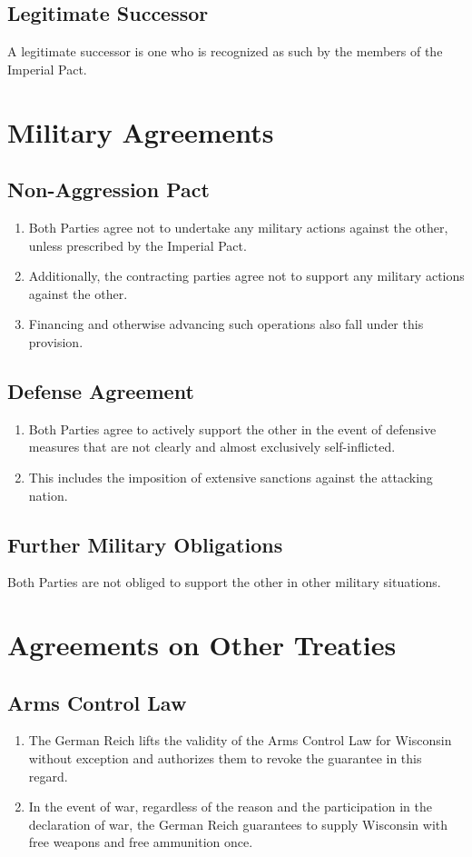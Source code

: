 \documentclass{article}
\begin{document}
\subsection{Legitimate Successor}
A legitimate successor is one who is recognized as such by the members of the Imperial Pact.

\section{Military Agreements}
\subsection{Non-Aggression Pact}
\begin{enumerate}[(1)]
    \item Both Parties agree not to undertake any military actions against the other, unless prescribed by the Imperial Pact.
    \item Additionally, the contracting parties agree not to support any military actions against the other.
    \item Financing and otherwise advancing such operations also fall under this provision.
\end{enumerate}

\subsection{Defense Agreement}
\begin{enumerate}[(1)]
    \item Both Parties agree to actively support the other in the event of defensive measures that are not clearly and almost exclusively self-inflicted.
    \item This includes the imposition of extensive sanctions against the attacking nation.
\end{enumerate}

\subsection{Further Military Obligations}
Both Parties are not obliged to support the other in other military situations.

\section{Agreements on Other Treaties}
\subsection{Arms Control Law}
\begin{enumerate}[(1)]
    \item The German Reich lifts the validity of the Arms Control Law for Wisconsin without exception and authorizes them to revoke the guarantee in this regard.
    \item In the event of war, regardless of the reason and the participation in the declaration of war, the German Reich guarantees to supply Wisconsin with free weapons and free ammunition once.
\end{enumerate}
\end{document}

